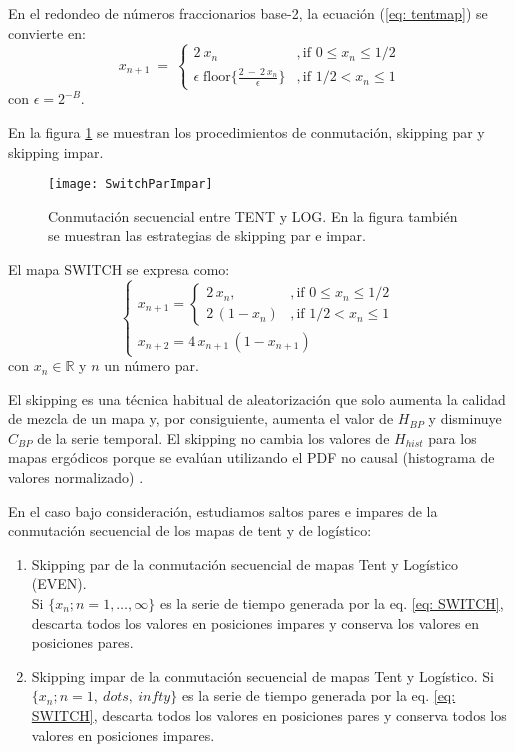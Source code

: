 En el redondeo de números fraccionarios base-2, la ecuación (\ref{eq: tentmap}) se convierte en:
%
\begin{equation}\label{eq:tentdecbin}
x_{n+1}~=~ \left\{ \begin{array}{ll}
2~{x_n} &, \textrm{if $0\leq x_n\leq 1/2$}\\
\epsilon \; \text{floor}\{\frac{2~-~2~x_n}{\epsilon}\} &, \textrm{if $1/2<x_n\leq 1$} 
\end{array} \right. 
\end{equation}
con $\epsilon=2^{-B}$.

En la figura \ref{fig:seq} se muestran los procedimientos de conmutación, skipping par y skipping impar.

\begin{figure}[htpb]
\centering	
	\texttt{[image: SwitchParImpar]}
	\caption{Conmutación secuencial entre TENT y LOG. En la figura también se muestran las estrategias de skipping par e impar.} \label{fig:seq}
\end{figure}

El mapa SWITCH se expresa como:
%
\begin{equation}
\begin{cases}
x_{n+1}=
\begin{cases}
2\,x_n, &, \mbox{if } 0\leq x_n\leq 1/2 \\
2\,(1-x_n ) &, \mbox{if } 1/2<x_n\leq 1
\end{cases} \\
x_{n+2}=4\,x_{n+1}\,(1-x_{n+1})
\end{cases}\label{eq:SWITCH}
\end{equation}
%
con $x_n \in \mathbb{R}$ y $n$ un número par.

El skipping es una técnica habitual de aleatorización que solo aumenta la calidad de mezcla de un mapa y, por consiguiente, aumenta el valor de $H_{BP}$ y disminuye $C_{BP}$ de la serie temporal.
El skipping no cambia los valores de $H_{hist}$ para los mapas ergódicos porque se evalúan utilizando el PDF no causal (histograma de valores normalizado) \cite{DeMicco2008}.

En el caso bajo consideración, estudiamos saltos pares e impares de la conmutación secuencial de los mapas de tent y de logístico:
\begin{enumerate}
	\item Skipping par de la conmutación secuencial de mapas Tent y Logístico (EVEN). \\
	Si $\{x_n; n = 1, \dots, \infty \}$ es la serie de tiempo generada por la eq. \ref{eq: SWITCH}, descarta todos los valores en posiciones impares y conserva los valores en posiciones pares.
	\item Skipping impar de la conmutación secuencial de mapas Tent y Logístico.
	Si $\{x_n; n = 1, \ dots, \ infty \}$ es la serie de tiempo generada por la eq. \ref{eq: SWITCH}, descarta todos los valores en posiciones pares y conserva todos los valores en posiciones impares.
\end{enumerate}

